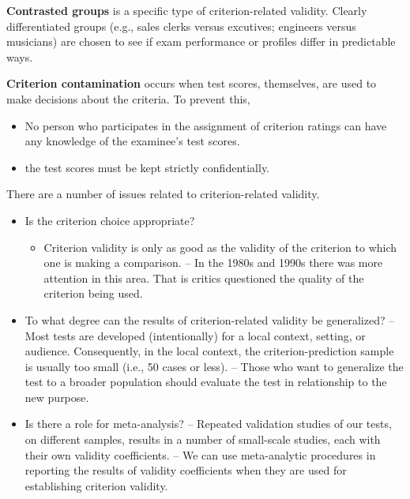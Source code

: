 \documentclass[
  english,
]{book}
\providecommand{\tightlist}{%
  \setlength{\itemsep}{0pt}\setlength{\parskip}{0pt}}
\begin{document}
\textbf{Contrasted groups} is a specific type of criterion-related validity. Clearly differentiated groups (e.g., sales clerks versus excutives; engineers versus musicians) are chosen to see if exam performance or profiles differ in predictable ways.

\textbf{Criterion contamination} occurs when test scores, themselves, are used to make decisions about the criteria. To prevent this,

\begin{itemize}
\tightlist
\item
  No person who participates in the assignment of criterion ratings can have any knowledge of the examinee's test scores.\\
\item
  the test scores must be kept strictly confidentially.
\end{itemize}

There are a number of issues related to criterion-related validity.

\begin{itemize}
\tightlist
\item
  Is the criterion choice appropriate?

  \begin{itemize}
  \tightlist
  \item
    Criterion validity is only as good as the validity of the criterion to which one is making a comparison.
    -- In the 1980s and 1990s there was more attention in this area. That is critics questioned the quality of the criterion being used.
  \end{itemize}
\item
  To what degree can the results of criterion-related validity be generalized?
  -- Most tests are developed (intentionally) for a local context, setting, or audience. Consequently, in the local context, the criterion-prediction sample is usually too small (i.e., 50 cases or less).
  -- Those who want to generalize the test to a broader population should evaluate the test in relationship to the new purpose.
\item
  Is there a role for meta-analysis?
  -- Repeated validation studies of our tests, on different samples, results in a number of small-scale studies, each with their own validity coefficients.
  -- We can use meta-analytic procedures in reporting the results of validity coefficients when they are used for establishing criterion validity.
\end{itemize}
\end{document}
